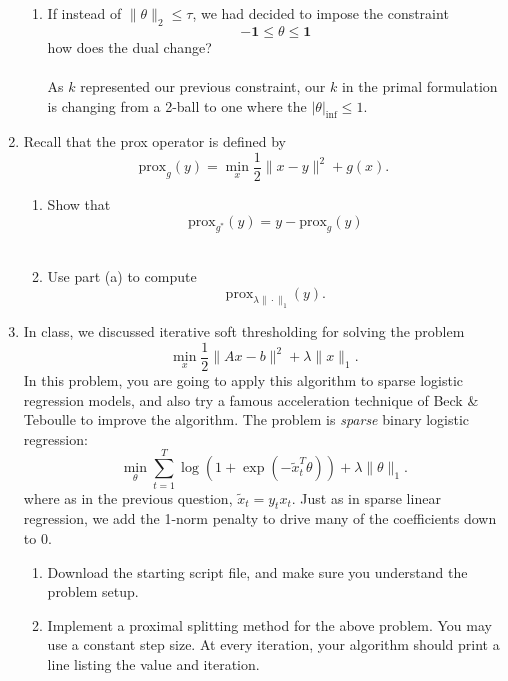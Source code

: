 \documentclass[12pt]{amsart}
\newcommand{\prox}{\mathrm{prox}}
\begin{document}
\begin{enumerate}
\begin{enumerate}
\item  If instead of $\|\theta\|_2 \leq \tau$, we had decided to impose the constraint 
  \[
- \mathbf{1} \leq \theta \leq \mathbf{1}
 \]
 how does the dual change? \\\\

\noindent
As $k$ represented our previous constraint, our $k$ in the primal formulation is changing from a 2-ball to one where the $|\theta|_\inf \leq 1$.

\end{enumerate}

\item Recall that the prox operator is defined by 
\[
\prox_g(y) = \min_x \frac{1}{2}\|x - y\|^2 + g(x).
\]
\begin{enumerate}

\item 
Show  that 
\[
\prox_{g^*} (y) = y - \prox_g(y)
\]
\\
\item Use part (a) to compute 
\[
\prox_{\lambda \|\cdot\|_1}(y).
\]

\end{enumerate}
\newpage

\item 

In class, we discussed iterative soft thresholding for solving the problem 
\[
\min_x \frac{1}{2} \|Ax - b\|^2 + \lambda \|x\|_1. 
\]
In this problem, you are going to apply this algorithm to sparse logistic regression models, 
and also try a famous acceleration technique of Beck \& Teboulle to improve the algorithm. 
The problem is {\it sparse} binary logistic regression: 
\[
\min_{\theta} \sum_{t = 1}^T \log(1 + \exp(-\tilde x_t^T\theta))  + \lambda \|\theta\|_1.
\]
where as in the previous question, $\tilde x_t = y_t x_t$. Just as in sparse linear regression, 
we add the 1-norm penalty to drive many of the coefficients down to $0$.


\begin{enumerate}

\item Download the starting script file, and make sure you understand the problem setup. \\


\item Implement a proximal splitting method for the above problem. 
You may use a constant step size. At every iteration, your algorithm should print 
a line listing the value and iteration. \\


\end{enumerate}
\end{enumerate}
\end{document}
